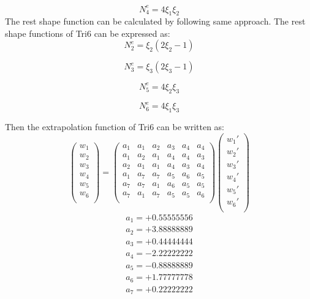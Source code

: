 \begin{equation}
N_4^e = 4\xi_1\xi_2
\end{equation}
The rest shape function can be calculated by following same approach. The rest shape functions of Tri6 can be expressed as:
\begin{equation}
N_2^e = \xi_2\left(2\xi_2-1\right)
\end{equation}

\begin{equation}
N_3^e = \xi_3\left(2\xi_3-1\right)
\end{equation}

\begin{equation}
N_5^e = 4\xi_2 \xi_3
\end{equation}

\begin{equation}
N_6^e = 4\xi_1 \xi_3
\end{equation}

Then the extrapolation function of Tri6 can be written as:
\begin{equation}
\begin{pmatrix}
w_1 \\
w_2 \\
w_3 \\
w_4 \\
w_5 \\
w_6 \\
\end{pmatrix} = \begin{pmatrix}
a_1 & a_1 &  a_2 &  a_3 & a_4 & a_4     \\[0.3em]
a_1 & a_2 &  a_1 &  a_4 & a_4 & a_3     \\[0.3em]
a_2 & a_1 &  a_1 &  a_4 & a_3 & a_4     \\[0.3em]
a_1 & a_7 &  a_7 &  a_5 & a_6 & a_5     \\[0.3em]
a_7 & a_7 &  a_1 &  a_6 & a_5 & a_5     \\[0.3em]
a_7 & a_1 &  a_7 &  a_5 & a_5 & a_6     \\[0.3em]            
\end{pmatrix} \begin{pmatrix}
{w_1}' \\
{w_2}' \\
{w_3}' \\
{w_4}' \\
{w_5}' \\
{w_6}' \\
\end{pmatrix}
\end{equation}	
\begin{align*}
a_1 = +0.55555556 \\
a_2 = +3.88888889 \\
a_3 = +0.44444444 \\
a_4 = -2.22222222 \\
a_5 = -0.88888889 \\
a_6 = +1.77777778 \\
a_7 = +0.22222222 \\
\end{align*}



